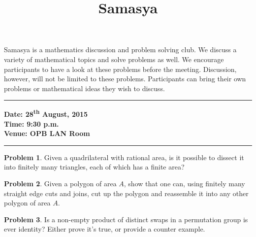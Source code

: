 \documentclass[10pt,a4paper,notitlepage]{article}
\title{\textrm{\textbf{\fontsize{30}{40}\selectfont Samasya}}}
\date{%
    }
\theoremstyle{definition}
\newtheorem{prob}{Problem}
\begin{document}
\maketitle

Samasya is a mathematics discussion and problem solving club.
We discuss a variety of mathematical topics and solve problems as well.
We encourage participants to have a look at these problems%
before the meeting.
Discussion, however, will not be limited to these problems.
Participants can bring their own problems or mathematical ideas they wish to discuss.\\
\hrule

\textbf{Date: 28\textsuperscript{th} August, 2015}%
\\
\textbf{Time: 9:30 p.m.}%
\\
\textbf{Venue: OPB LAN Room}%
\\
\hrule


\begin{prob}
Given a quadrilateral with rational area, is it possible to dissect it into finitely many triangles, each of which has a finite area?
\end{prob}

\begin{prob}
Given a polygon of area $A$, show that one can, using finitely many straight edge cuts and joins, cut up the polygon and reassemble it into any other polygon of area $A$.
\end{prob}

\begin{prob}
Is a non-empty product of distinct swaps in a permutation group is ever identity? Either prove it's true, or provide a counter example.
\end{prob}
\end{document}
